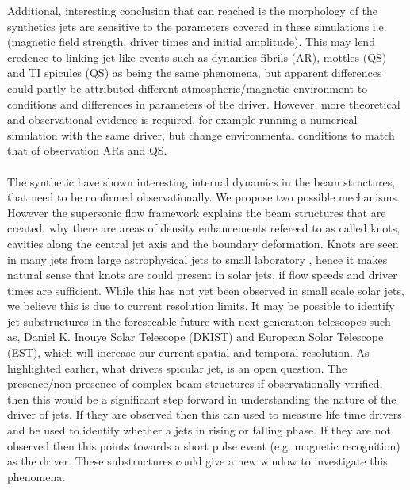\documentclass[12pt]{ociamthesis}
\newcommand{\np}{\\ \\}
\begin{document}
Additional, interesting conclusion that can reached is the morphology of the synthetics jets are sensitive to the parameters covered in these simulations i.e. (magnetic field strength, driver times and initial amplitude). This may lend credence to linking jet-like events such as dynamics fibrils (AR), mottles (QS) and TI spicules (QS) as being the same phenomena, but apparent differences could partly be attributed different atmospheric/magnetic environment to conditions and differences in parameters of the driver. However, more theoretical and observational evidence is required, for example running a numerical simulation with the same driver, but change environmental conditions to match that of observation ARs and QS. \np
%
The synthetic have shown interesting internal dynamics in the beam structures, that need to be confirmed observationally. We propose two possible mechanisms. However the supersonic flow framework explains the beam structures that are created, why there are areas of density enhancements refereed to as called knots, cavities along the central jet axis and the boundary deformation. Knots are seen in many jets from large astrophysical jets \citep{van_Putten_1996ApJ467L57V, DeGouveiaDalPino2005, Hada2013ApJ77570H, Cohen2014ApJ787151C, Hervet2017AnA606A103H} to small laboratory \citep{Menon2010, Edgington-Mitchell2014, Ono2014}, hence it makes natural sense that knots are could present in solar jets, if flow speeds and driver times are sufficient. While this has not yet been observed in small scale solar jets, we believe this is due to current resolution limits. It may be possible to identify jet-substructures in the foreseeable future with next generation telescopes such as, Daniel K. Inouye Solar Telescope (DKIST) and European Solar Telescope (EST), which will increase our current spatial and temporal resolution. As highlighted earlier, what drivers spicular jet, is an open question. The presence/non-presence of complex beam structures if observationally verified, then this would be a significant step forward in understanding the nature of the driver of jets. If they are observed then this can used to measure life time drivers and be used to identify whether a jets in rising or falling phase. If they are not observed then this points towards a short pulse event (e.g. magnetic recognition) as the driver. These substructures could give a new window to investigate this phenomena.



\end{document}
